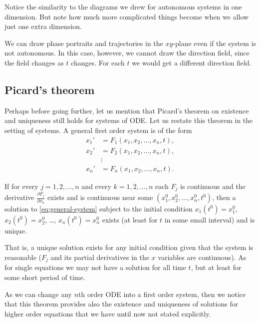 Notice the similarity to the diagrams we drew for autonomous systems in one
dimension.  But note how much more complicated things become when we
allow just one extra dimension.

We can draw phase portraits and trajectories in the $xy$-plane
even if the system is not autonomous.  In this case, however, we cannot draw
the direction field, since the field changes as $t$ changes.  For
each $t$ we would get a different direction field.

\subsection{Picard's theorem}

Perhaps before going further, let us mention that Picard's theorem on
existence and uniqueness still holds for systems of ODE\@.  Let us restate
this theorem in the setting of systems.  A general first order
system is of the form
\begin{equation} \label{eq:general-system}
\begin{aligned}
x_1' & = F_1(x_1,x_2,\ldots,x_n,t) , \\
x_2' & = F_2(x_1,x_2,\ldots,x_n,t) , \\
& \vdots \\
x_n' & = F_n(x_1,x_2,\ldots,x_n,t) .
\end{aligned}
\end{equation}

\begin{theorem}%
\label{sys:picardthm}%
If for every $j=1,2,\ldots,n$ and every
$k = 1,2,\ldots,n$
each $F_j$ is continuous
and the derivative
$\frac{\partial F_j}{\partial x_k}$ exists and is
continuous near some $(x_1^0,x_2^0,\ldots,x_n^0,t^0)$, then a solution to
\eqref{eq:general-system}
subject to the initial condition
$x_1(t^0) = x_1^0$,
$x_2(t^0) = x_2^0$, \ldots,
$x_n(t^0) = x_n^0$
exists (at least for $t$ in some small interval) and is unique.
\end{theorem}

That is, a unique solution exists for any initial condition
given that the system is reasonable ($F_j$ and its partial derivatives
in the $x$ variables are continuous).  As for single equations
we may not have a solution for all time $t$, but at least for some 
short period of time.

As we can change any $n$th order ODE into a first order system,
then we notice that this theorem provides also the
existence and uniqueness of solutions for higher order equations
that we have until now not stated explicitly.

